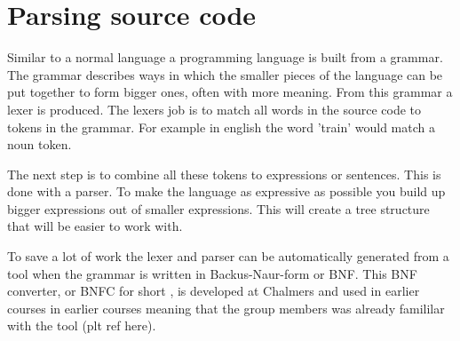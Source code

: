 \section{Parsing source code} \label{sec:bnfc}


Similar to a normal language a programming language is built from a grammar. 
The grammar describes ways in which the smaller pieces of the language can be put
together to form bigger ones, often with more meaning.
From this grammar a lexer is produced. The lexers job is to match all words in the
source code to tokens in the grammar. For example in english the word 'train' 
would match a noun token. 

The next step is to combine all these tokens to expressions or sentences. This
is done with a parser. To make the language as expressive as possible you build
up bigger expressions out of smaller expressions. This will create a tree
structure that will be easier to work with. 

To save a lot of work the lexer and parser can be automatically generated from
a tool when the grammar is written in Backus-Naur-form or BNF. This BNF converter, or
BNFC for short , is developed at Chalmers and used in earlier courses in earlier courses meaning that the group members was already famililar with the tool (plt ref here).



